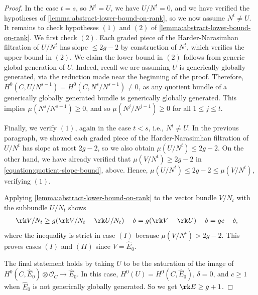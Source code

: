 \begin{proof}
	In the case $t = s$, so $N^t = U$, we have $U/N^t = 0$, and we have verified the hypotheses of
	\autoref{lemma:abstract-lower-bound-on-rank},
	so we now assume $N^t \neq U$.
	It remains to check hypotheses $(1)$ and $(2)$ of
	\autoref{lemma:abstract-lower-bound-on-rank}.
	We first check $(2)$. Each
	graded piece of the Harder-Narasimhan filtration of $U/N^t$
	has slope $\leq 2g - 2$ by construction of $N^t$, which verifies
	the upper bound in $(2)$.
	We claim the lower bound in $(2)$ follows from generic global generation of $U$.
	Indeed, recall we are assuming $U$ is generically globally generated, via
	the reduction made near the beginning of the proof.
	Therefore,
	$H^0(C, U/N^{s-1})
	= H^0(C, N^s/N^{s-1}) \neq 0$,
	as any quotient bundle of a generically globally generated bundle is
	generically globally generated.
	This implies $\mu(N^s/N^{s-1}) \geq 0$, and so $\mu(N^j/N^{j-1}) \geq 0$ for
	all $1 \leq j \leq t$.

	Finally, we verify $(1)$, again in the case $t< s$, i.e., $N^t \neq U$.
	In the previous paragraph, we showed each graded piece of the
	Harder-Narasimhan filtration of $U/N^t$ has slope at most $2g -2$, so
	we also obtain $\mu(U/N^t) \leq 2g - 2$.
	On the other hand, we have already verified that $\mu(V/N^t) \geq 2g-2$
	in \eqref{equation:quotient-slope-bound}, above.
	Hence,
	$\mu(U/N^t) \leq 2g-2 \leq \mu(V/N^t)$,
	verifying $(1)$.

	Applying \autoref{lemma:abstract-lower-bound-on-rank} to the vector bundle
	$V/N_t$ with the subbundle $U/N_t$ shows
	\begin{align*}
	    \rk V/N_t &\geq g(\rk V/N_t -
	\rk U/N_t) - \delta
	= g(\rk V -
	\rk U)-\delta
	=gc - \delta,
	\end{align*}
	where the inequality is strict in case $(I)$ because $\mu(V/N^t) > 2g -
	2$.
	This proves cases $(I)$ and $(II)$ since $V = \widehat{E}_0$.

	The final statement
	holds by taking $U$ to be the saturation of the image of
	$H^0(C, \widehat{E}_0) \otimes \mathscr O_C \to \widehat{E}_0$.
	In this case, $H^0(U) = H^0(C, \widehat{E}_0)$, $\delta = 0$,
	and $c \geq 1$
	when $\widehat{E}_0$ is not generically globally generated. So we get
	$\rk E \geq g + 1$.
\end{proof}




